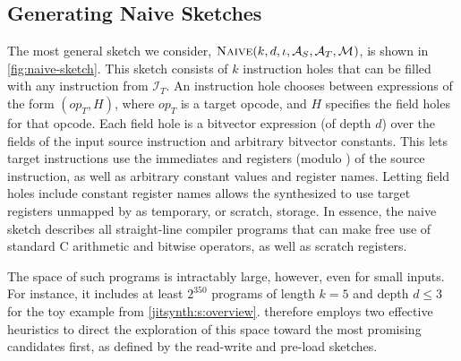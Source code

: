 \subsection{Generating Naive Sketches}\label{s:algorithm:naive}

The most general sketch we consider, $\Naive(k,d,\iota,\arm_S,\arm_T,\Map)$, is
shown in \autoref{fig:naive-sketch}. This sketch consists of $k$ instruction
holes that can be filled with any instruction from $\mathcal{I}_T$. An
instruction hole chooses between expressions of the form $(\mathit{op}_T, H)$,
where $\mathit{op}_T$ is a target opcode, and $H$ specifies the field holes for
that opcode. Each field hole is a bitvector expression (of depth $d$) over the
fields of the input source instruction and arbitrary bitvector constants. This
lets target instructions use the immediates and registers (modulo \Map) of the
source instruction, as well as arbitrary constant values and register names.
Letting field holes include constant register names allows the synthesized
\minicompilers to use target registers unmapped by \Map as temporary, or
scratch, storage. In essence, the naive sketch describes all straight-line
compiler programs that can make free use of standard C arithmetic and bitwise
operators, as well as scratch registers.\tighten 

The space of such programs is intractably large, however, even for small inputs.
For instance, it includes at least $2^{350}$ programs of length $k=5$ and depth
$d\leq 3$ for the toy example from \autoref{jitsynth:s:overview}. \jitsynth therefore
employs two effective heuristics to direct the exploration of this space toward
the most promising candidates first, as defined by the read-write and pre-load
sketches.\tighten 

